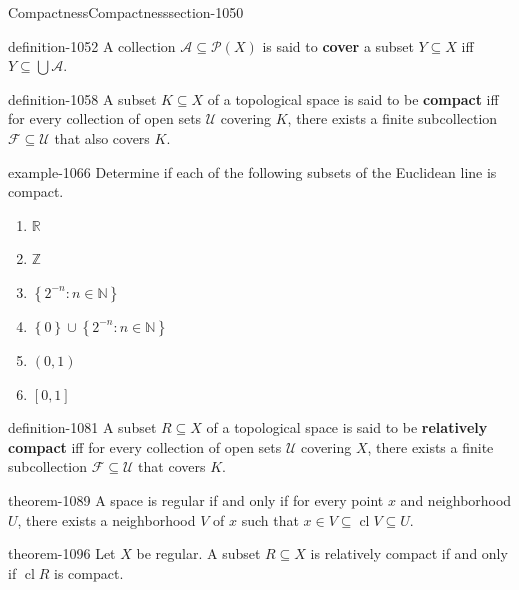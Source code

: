 \documentclass[oneside,10pt,]{article}
\newcommand{\terminology}[1]{\textbf{#1}}
\newcommand{\mb}{\mathbb}
\newcommand{\mc}{\mathcal}
\newcommand{\cl}{\operatorname{cl}}
\newcommand{\setBuilder}[2]{\left\{#1:#2\right\}}
\newcommand{\setList}[1]{\left\{#1\right\}}
\begin{document}
\begin{sectionptx}{Compactness}{}{Compactness}{}{}{section-1050}
\begin{definition}{}{definition-1052}%
\hypertarget{p-1053}{}%
A collection \(\mc A\subseteq \mc P(X)\) is said to \terminology{cover} a subset \(Y\subseteq X\) iff \(Y\subseteq\bigcup\mc A\).%
\end{definition}
\begin{definition}{}{definition-1058}%
\hypertarget{p-1059}{}%
A subset \(K\subseteq X\) of a topological space is said to be \terminology{compact} iff for every collection of open sets \(\mc U\) covering \(K\), there exists a finite subcollection \(\mc F\subseteq\mc U\) that also covers \(K\).%
\end{definition}
\begin{example}{}{example-1066}%
\hypertarget{p-1067}{}%
Determine if each of the following subsets of the Euclidean line is compact.%
\leavevmode%
\begin{enumerate}
\item\hypertarget{li-1069}{}\(\mb R\)%
\item\hypertarget{li-1071}{}\(\mb Z\)%
\item\hypertarget{li-1073}{}\(\setBuilder{2^{-n}}{n\in\mb N}\)%
\item\hypertarget{li-1075}{}\(\setList{0}\cup\setBuilder{2^{-n}}{n\in\mb N}\)%
\item\hypertarget{li-1077}{}\((0,1)\)%
\item\hypertarget{li-1079}{}\([0,1]\)%
\end{enumerate}
\end{example}
\begin{definition}{}{definition-1081}%
\hypertarget{p-1082}{}%
A subset \(R\subseteq X\) of a topological space is said to be \terminology{relatively compact} iff for every collection of open sets \(\mc U\) covering \(X\), there exists a finite subcollection \(\mc F\subseteq\mc U\) that covers \(K\).%
\end{definition}
\begin{theorem}{}{}{theorem-1089}%
\hypertarget{p-1090}{}%
A space is regular if and only if for every point \(x\) and neighborhood \(U\), there exists a neighborhood \(V\) of \(x\) such that \(x\in V\subseteq\cl V\subseteq U\).%
\end{theorem}
\begin{theorem}{}{}{theorem-1096}%
\hypertarget{p-1097}{}%
Let \(X\) be regular. A subset \(R\subseteq X\) is relatively compact if and only if \(\cl R\) is compact.%

\end{theorem}
\end{sectionptx}
\end{document}
